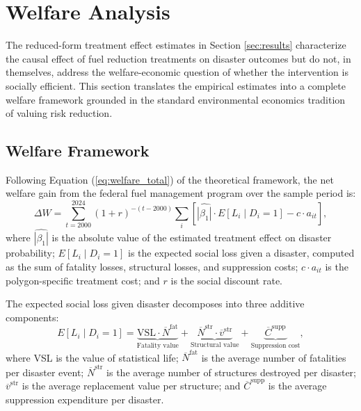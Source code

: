 \documentclass[12pt, letterpaper]{article}
\begin{document}
\section{Welfare Analysis}\label{sec:welfare}

The reduced-form treatment effect estimates in Section \ref{sec:results} characterize the causal effect of fuel reduction treatments on disaster outcomes but do not, in themselves, address the welfare-economic question of whether the intervention is socially efficient. This section translates the empirical estimates into a complete welfare framework grounded in the standard environmental economics tradition of valuing risk reduction.

\subsection{Welfare Framework}

Following Equation (\ref{eq:welfare_total}) of the theoretical framework, the net welfare gain from the federal fuel management program over the sample period is:
\begin{equation}
\Delta W = \sum_{t = 2000}^{2024} (1+r)^{-(t - 2000)} \sum_i \left[\widehat{|\beta_1|} \cdot E[L_i \mid D_i = 1] - c \cdot a_{it}\right],
\label{eq:welfare_emp}
\end{equation}
where $\widehat{|\beta_1|}$ is the absolute value of the estimated treatment effect on disaster probability; $E[L_i \mid D_i = 1]$ is the expected social loss given a disaster, computed as the sum of fatality losses, structural losses, and suppression costs; $c \cdot a_{it}$ is the polygon-specific treatment cost; and $r$ is the social discount rate.

The expected social loss given disaster decomposes into three additive components:
\begin{equation}
E[L_i \mid D_i = 1] = \underbrace{\text{VSL} \cdot \overline{N}^{\text{fat}}}_{\text{Fatality value}} + \underbrace{\overline{N}^{\text{str}} \cdot \overline{v}^{\text{str}}}_{\text{Structural value}} + \underbrace{\overline{C}^{\text{supp}}}_{\text{Suppression cost}},
\label{eq:loss_decomp}
\end{equation}
where VSL is the value of statistical life; $\overline{N}^{\text{fat}}$ is the average number of fatalities per disaster event; $\overline{N}^{\text{str}}$ is the average number of structures destroyed per disaster; $\overline{v}^{\text{str}}$ is the average replacement value per structure; and $\overline{C}^{\text{supp}}$ is the average suppression expenditure per disaster.
\end{document}
